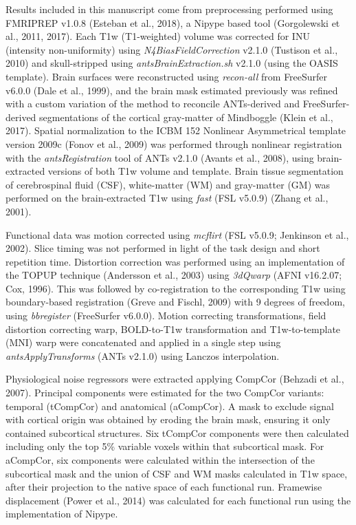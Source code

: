 \documentclass[9pt]{NEU502b-fmri}
\begin{document}
Results included in this manuscript come from preprocessing performed using FMRIPREP v1.0.8 (Esteban et al., 2018), a Nipype based tool (Gorgolewski et al., 2011, 2017). Each T1w (T1-weighted) volume was corrected for INU (intensity non-uniformity) using \textit{N4BiasFieldCorrection} v2.1.0  (Tustison et al., 2010) and skull-stripped using \textit{antsBrainExtraction.sh} v2.1.0 (using the OASIS template). Brain surfaces were reconstructed using \textit{recon-all} from FreeSurfer v6.0.0 (Dale et al., 1999), and the brain mask estimated previously was refined with a custom variation of the method to reconcile ANTs-derived and FreeSurfer-derived segmentations of the cortical gray-matter of Mindboggle (Klein et al., 2017). Spatial normalization to the ICBM 152 Nonlinear Asymmetrical template version 2009c (Fonov et al., 2009) was performed through nonlinear registration with the \textit{antsRegistration} tool of ANTs v2.1.0 (Avants et al., 2008), using brain-extracted versions of both T1w volume and template. Brain tissue segmentation of cerebrospinal fluid (CSF), white-matter (WM) and gray-matter (GM) was performed on the brain-extracted T1w using \textit{fast} (FSL v5.0.9) (Zhang et al., 2001).

Functional data was motion corrected using \textit{mcflirt} (FSL v5.0.9; Jenkinson et al., 2002). Slice timing was not performed in light of the task design and short repetition time. Distortion correction was performed using an implementation of the TOPUP technique (Andersson et al., 2003) using \textit{3dQwarp} (AFNI v16.2.07; Cox, 1996). This was followed by co-registration to the corresponding T1w using boundary-based registration (Greve and Fischl, 2009) with 9 degrees of freedom, using \textit{bbregister} (FreeSurfer v6.0.0). Motion correcting transformations, field distortion correcting warp, BOLD-to-T1w transformation and T1w-to-template (MNI) warp were concatenated and applied in a single step using \textit{antsApplyTransforms} (ANTs v2.1.0) using Lanczos interpolation.

Physiological noise regressors were extracted applying CompCor (Behzadi et al., 2007). Principal components were estimated for the two CompCor variants: temporal (tCompCor) and anatomical (aCompCor). A mask to exclude signal with cortical origin was obtained by eroding the brain mask, ensuring it only contained subcortical structures. Six tCompCor components were then calculated including only the top 5\% variable voxels within that subcortical mask. For aCompCor, six components were calculated within the intersection of the subcortical mask and the union of CSF and WM masks calculated in T1w space, after their projection to the native space of each functional run. Framewise displacement (Power et al., 2014) was calculated for each functional run using the implementation of Nipype.
\end{document}
